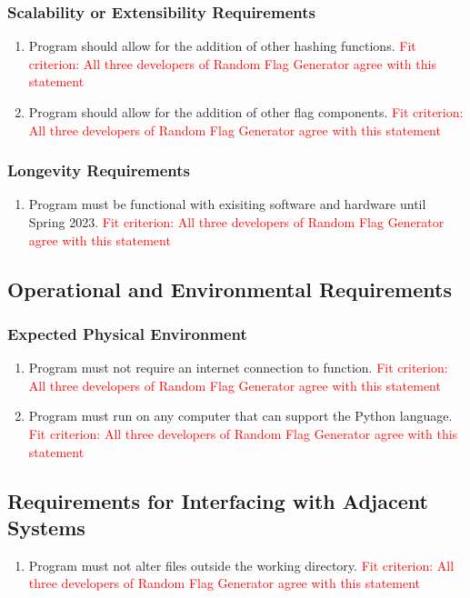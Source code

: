 \documentclass[12pt, titlepage]{article}
\begin{document}
\subsubsection{Scalability or Extensibility Requirements}
\begin{enumerate}[label=PE\arabic*., resume=pes]
    \item Program should allow for the addition of other hashing functions. \textcolor{red}{Fit criterion: All three developers of Random Flag Generator agree with this statement}
    \item Program should allow for the addition of other flag components. \textcolor{red}{Fit criterion: All three developers of Random Flag Generator agree with this statement}
\end{enumerate} 
\subsubsection{Longevity Requirements}
\begin{enumerate}[label=PE\arabic*., resume=pes]
    \item Program must be functional with exisiting software and hardware until Spring 2023. \textcolor{red}{Fit criterion: All three developers of Random Flag Generator agree with this statement}
\end{enumerate} 
\subsection{Operational and Environmental Requirements}
\subsubsection{Expected Physical Environment}
\begin{enumerate}[label=PE\arabic*., resume=pes]
    \item Program must not require an internet connection to function. \textcolor{red}{Fit criterion: All three developers of Random Flag Generator agree with this statement}
    \item Program must run on any computer that can support the Python language. \textcolor{red}{Fit criterion: All three developers of Random Flag Generator agree with this statement}
\end{enumerate} 

\subsection{Requirements for Interfacing with Adjacent Systems}
\begin{enumerate}[label=PE\arabic*., resume=pes]
    \item Program must not alter files outside the working directory. \textcolor{red}{Fit criterion: All three developers of Random Flag Generator agree with this statement}
\end{enumerate} 
\end{document}
